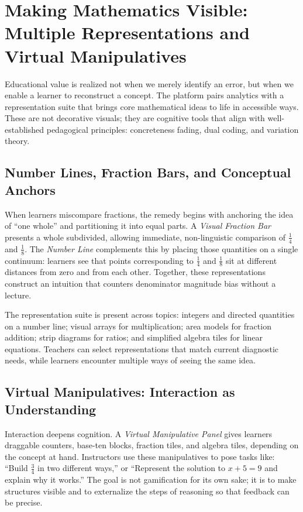 \section{Making Mathematics Visible: Multiple Representations and Virtual Manipulatives}

Educational value is realized not when we merely identify an error, but when we enable a learner to reconstruct a concept. The platform pairs analytics with a representation suite that brings core mathematical ideas to life in accessible ways. These are not decorative visuals; they are cognitive tools that align with well-established pedagogical principles: concreteness fading, dual coding, and variation theory.

\subsection{Number Lines, Fraction Bars, and Conceptual Anchors}

When learners miscompare fractions, the remedy begins with anchoring the idea of ``one whole'' and partitioning it into equal parts. A \emph{Visual Fraction Bar} presents a whole subdivided, allowing immediate, non-linguistic comparison of $\tfrac{1}{4}$ and $\tfrac{1}{8}$. The \emph{Number Line} complements this by placing those quantities on a single continuum: learners see that points corresponding to $\tfrac{1}{4}$ and $\tfrac{1}{8}$ sit at different distances from zero and from each other. Together, these representations construct an intuition that counters denominator magnitude bias without a lecture.

The representation suite is present across topics: integers and directed quantities on a number line; visual arrays for multiplication; area models for fraction addition; strip diagrams for ratios; and simplified algebra tiles for linear equations. Teachers can select representations that match current diagnostic needs, while learners encounter multiple ways of seeing the same idea.

\subsection{Virtual Manipulatives: Interaction as Understanding}

Interaction deepens cognition. A \emph{Virtual Manipulative Panel} gives learners draggable counters, base-ten blocks, fraction tiles, and algebra tiles, depending on the concept at hand. Instructors use these manipulatives to pose tasks like: ``Build $\tfrac{3}{4}$ in two different ways,'' or ``Represent the solution to $x+5=9$ and explain why it works.'' The goal is not gamification for its own sake; it is to make structures visible and to externalize the steps of reasoning so that feedback can be precise.

